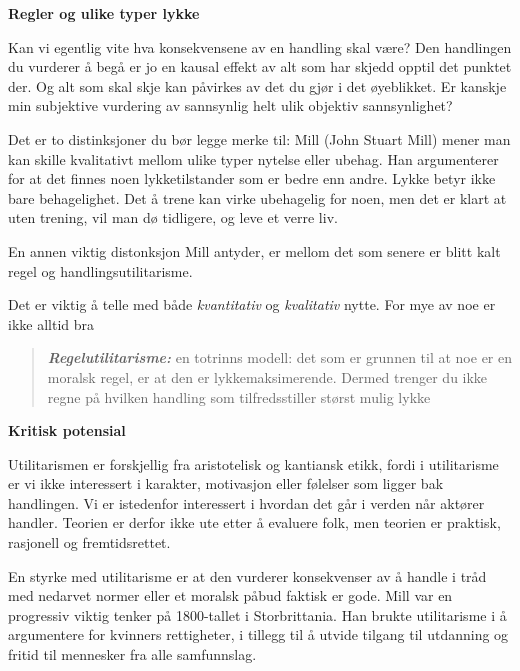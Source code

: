 \documentclass[11pt, a4paper]{article}
\newenvironment{sectionbox}[1][]{%
    \begin{sectionboxinner}
    \textbf{\large #1}
    \vspace{1pt}
    \newline
}{%
    \end{sectionboxinner}
}
\begin{document}
\begin{sectionbox}[Regler og ulike typer lykke]
\begin{flushleft}
    Kan vi egentlig vite hva konsekvensene av en handling skal være? Den handlingen du vurderer å begå er jo en kausal effekt av alt som har skjedd opptil det punktet der. Og alt som skal skje kan påvirkes av det du gjør i det øyeblikket. Er kanskje min subjektive vurdering av sannsynlig helt ulik objektiv sannsynlighet? \newline

    Det er to distinksjoner du bør legge merke til: Mill (John Stuart Mill) mener man kan skille kvalitativt mellom ulike typer nytelse eller ubehag. Han argumenterer for at det finnes noen lykketilstander som er bedre enn andre. Lykke betyr ikke bare behagelighet. Det å trene kan virke ubehagelig for noen, men det er klart at uten trening, vil man dø tidligere, og leve et verre liv.  \newline

    En annen viktig distonksjon Mill antyder, er mellom det som senere er blitt kalt regel og handlingsutilitarisme.\newline

    Det er viktig å telle med både \textit{kvantitativ} og \textit{kvalitativ} nytte. For mye av noe er ikke alltid bra

    \begin{quote}
        \textbf{\textit{Regelutilitarisme: }} en totrinns modell: det som er grunnen til at noe er en moralsk regel, er at den er lykkemaksimerende. Dermed trenger du ikke regne på hvilken handling som tilfredsstiller størst mulig lykke
    \end{quote}
\end{flushleft}
\end{sectionbox}

\begin{sectionbox}[Kritisk potensial]
\begin{flushleft}
    Utilitarismen er forskjellig fra aristotelisk og kantiansk etikk, fordi i utilitarisme er vi ikke interessert i karakter, motivasjon eller følelser som ligger bak handlingen. Vi er istedenfor interessert i hvordan det går i verden når aktører handler. Teorien er derfor ikke ute etter å evaluere folk, men teorien er praktisk, rasjonell og fremtidsrettet.\newline

    En styrke med utilitarisme er at den vurderer konsekvenser av å handle i tråd med nedarvet normer eller et moralsk påbud faktisk er gode. Mill var en progressiv viktig tenker på 1800-tallet i Storbrittania. Han brukte utilitarisme i å argumentere for kvinners rettigheter, i tillegg til å utvide tilgang til utdanning og fritid til mennesker fra alle samfunnslag.
\end{flushleft}
\end{sectionbox}
\end{document}
